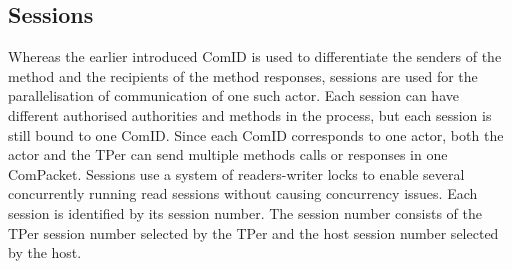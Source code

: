 



\subsection{Sessions}

Whereas the earlier introduced ComID is used to differentiate the senders of the method and the recipients of the method responses, sessions are used for the parallelisation of communication of one such actor. Each session can have different authorised authorities and methods in the process, but each session is still bound to one ComID. Since each ComID corresponds to one actor, both the actor and the TPer can send multiple methods calls or responses in one ComPacket.
 
Sessions use a system of readers-writer locks to enable several concurrently running read sessions without causing concurrency issues.
Each session is identified by its session number. The session number consists of the TPer session number selected by the TPer and the host session number selected by the host.

